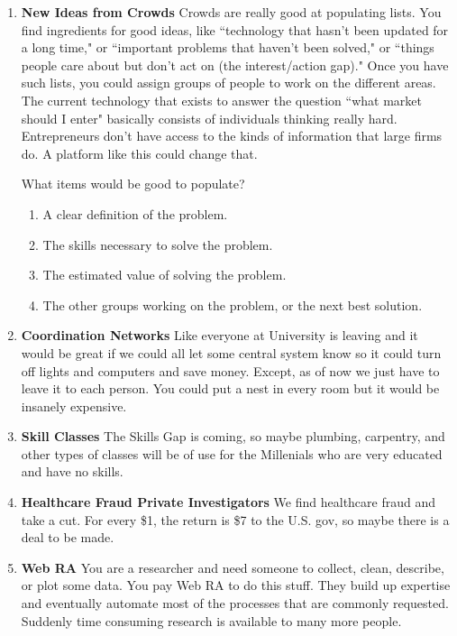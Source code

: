 \documentclass[paper=a4, fontsize=11pt]{scrartcl} %
\numberwithin{equation}{section} %
\numberwithin{figure}{section} %
\numberwithin{table}{section} %
\begin{document}
\begin{enumerate}
\item \textbf{New Ideas from Crowds}  Crowds are really good at populating lists.  You find ingredients for good ideas, like ``technology that hasn't been updated for a long time," or ``important problems that haven't been solved," or ``things people care about but don't act on (the interest/action gap)."  Once you have such lists, you could assign groups of people to work on the different areas.  The current technology that exists to answer the question ``what market should I enter" basically consists of individuals thinking really hard.  Entrepreneurs don't have access to the kinds of information that large firms do.  A platform like this could change that.  
	
What items would be good to populate?
	\begin{enumerate}
	\item A clear definition of the problem.
	\item The skills necessary to solve the problem.
	\item The estimated value of solving the problem.  
	\item The other groups working on the problem, or the next best solution.
	\end{enumerate}

\item \textbf{Coordination Networks} Like everyone at  University is leaving and it would be great if we could all let some central system know so it could turn off lights and computers and save money.  Except, as of now we just have to leave it to each person.  You could put a nest in every room but it would be insanely expensive. 

\item \textbf{Skill Classes}  The Skills Gap is coming, so maybe plumbing, carpentry, and other types of classes will be of use for the Millenials who are very educated and have no skills.  

\item \textbf{Healthcare Fraud Private Investigators} We find healthcare fraud and take a cut.  For every \$1, the return is \$7 to the U.S. gov, so maybe there is a deal to be made.

\item \textbf{Web RA} You are a researcher and need someone to collect, clean, describe, or plot some data.  You pay Web RA to do this stuff.  They build up expertise and eventually automate most of the processes that are commonly requested.  Suddenly time consuming research is available to many more people.  


\end{enumerate}
\end{document}
